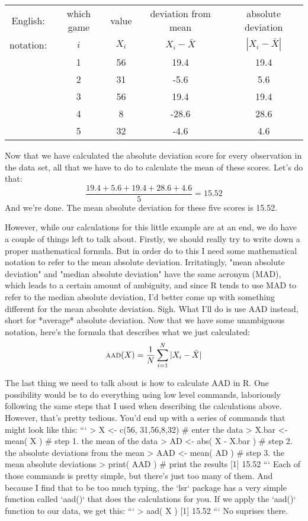 \begin{center}
\begin{tabular}{ccccc} 
English: & which game & value & deviation from mean & absolute deviation \\
notation: & $i$ & $X_i$ & $X_i - \bar{X}$ &  $|X_i - \bar{X}|$ \\ \hline
& 1 & 56 & 19.4  & 19.4\\
& 2 & 31 &  -5.6 & 5.6\\ 
& 3 & 56 & 19.4  & 19.4\\
& 4 & 8 & -28.6  & 28.6\\
& 5 & 32 & -4.6  & 4.6 \\
\end{tabular}
\end{center}


Now that we have calculated the absolute deviation score for every observation in the data set, all that we have to do to calculate the mean of these scores. Let's do that:
$$
\frac{19.4 + 5.6 + 19.4 + 28.6 + 4.6}{5} = 15.52
$$
And we're done. The mean absolute deviation for these five scores is 15.52. 

However, while our calculations for this little example are at an end, we do have a couple of things left to talk about. Firstly, we should really try to write down a proper mathematical formula. But in order do to this I need some mathematical notation to refer to the mean absolute deviation. Irritatingly, "mean absolute deviation" and "median absolute deviation" have the same acronym (MAD), which leads to a certain amount of ambiguity, and since R tends to use MAD to refer to the median absolute deviation, I'd better come up with something different for the mean absolute deviation. Sigh. What I'll do is use AAD instead, short for *average* absolute deviation. Now that we have some unambiguous notation, here's the formula that describes what we just calculated:
$$
\mbox{\textsc{aad}}(X) = \frac{1}{N} \sum_{i = 1}^N |X_i - \bar{X}|
$$

The last thing we need to talk about is how to calculate AAD in R. One possibility would be to do everything using low level commands, laboriously following the same steps that I used when describing the calculations above. However, that's pretty tedious. You'd end up with a series of commands that might look like this:
```
> X <- c(56, 31,56,8,32)   # enter the data
> X.bar <- mean( X )       # step 1. the mean of the data
> AD <- abs( X - X.bar )   # step 2. the absolute deviations from the mean
> AAD <- mean( AD )        # step 3. the mean absolute deviations
> print( AAD )             # print the results
[1] 15.52
```
Each of those commands is pretty simple, but there's just too many of them. And because I find that to be too much typing, the `lsr` package has a very simple function called `aad()` that does the calculations for you. If we apply the `aad()` function to our data, we get this:
```
> aad( X )
[1] 15.52
```
No suprises there.


